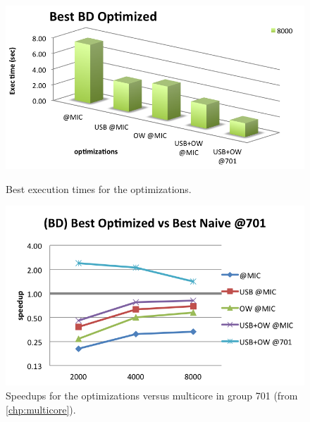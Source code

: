 \documentclass[../thesis]{subfiles}
\begin{document}
	\begin{figure}[t]
		\begin{minipage}{0.48\textwidth}
			\centering
			\includegraphics[width=\textwidth]{assets/images/mic/optims/best.png}
			\captionsetup{font=small}
			\caption{Best execution times for the optimizations.}
			\label{fig:mic:optims:best:times}
		\end{minipage}
		\hfill
		\begin{minipage}{0.48\textwidth}
			\centering
			\includegraphics[width=\textwidth]{assets/images/mic/optims/best-speedup.png}
			\captionsetup{font=small}
			\caption{Speedups for the optimizations versus multicore in group 701 (from \cref{chp:multicore}).}
			\label{fig:mic:optims:best:speedup}
		\end{minipage}
	\end{figure}
\end{document}

